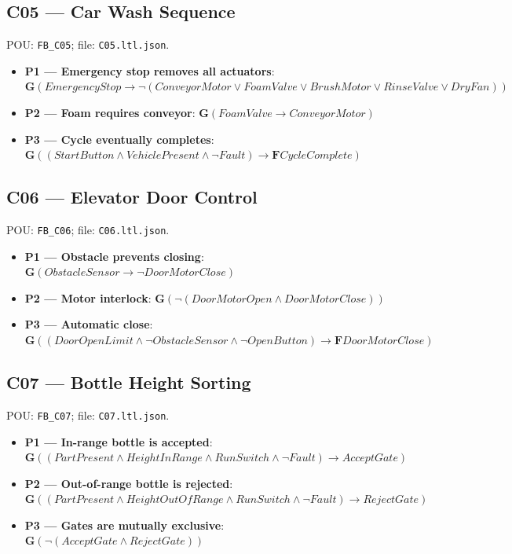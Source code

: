 \subsection*{C05 --- Car Wash Sequence}
\noindent POU: \texttt{FB\_C05}; file: \texttt{C05.ltl.json}.
\begin{small}
\begin{itemize}
\item \textbf{P1 --- Emergency stop removes all actuators}: $\mathbf{G}(EmergencyStop \rightarrow \neg (ConveyorMotor \vee FoamValve \vee BrushMotor \vee RinseValve \vee DryFan))$
\item \textbf{P2 --- Foam requires conveyor}: $\mathbf{G}(FoamValve \rightarrow ConveyorMotor)$
\item \textbf{P3 --- Cycle eventually completes}: $\mathbf{G}((StartButton \wedge VehiclePresent \wedge \neg Fault) \rightarrow \mathbf{F} CycleComplete)$
\end{itemize}
\end{small}

\subsection*{C06 --- Elevator Door Control}
\noindent POU: \texttt{FB\_C06}; file: \texttt{C06.ltl.json}.
\begin{small}
\begin{itemize}
\item \textbf{P1 --- Obstacle prevents closing}: $\mathbf{G}(ObstacleSensor \rightarrow \neg DoorMotorClose)$
\item \textbf{P2 --- Motor interlock}: $\mathbf{G}( \neg (DoorMotorOpen \wedge DoorMotorClose))$
\item \textbf{P3 --- Automatic close}: $\mathbf{G}((DoorOpenLimit \wedge \neg ObstacleSensor \wedge \neg OpenButton) \rightarrow \mathbf{F} DoorMotorClose)$
\end{itemize}
\end{small}

\subsection*{C07 --- Bottle Height Sorting}
\noindent POU: \texttt{FB\_C07}; file: \texttt{C07.ltl.json}.
\begin{small}
\begin{itemize}
\item \textbf{P1 --- In-range bottle is accepted}: $\mathbf{G}((PartPresent \wedge HeightInRange \wedge RunSwitch \wedge \neg Fault) \rightarrow AcceptGate)$
\item \textbf{P2 --- Out-of-range bottle is rejected}: $\mathbf{G}((PartPresent \wedge HeightOutOfRange \wedge RunSwitch \wedge \neg Fault) \rightarrow RejectGate)$
\item \textbf{P3 --- Gates are mutually exclusive}: $\mathbf{G}( \neg (AcceptGate \wedge RejectGate))$
\end{itemize}
\end{small}

